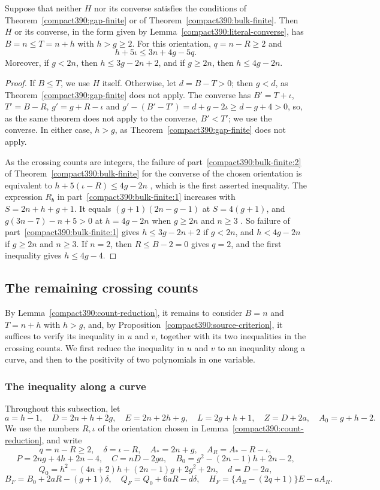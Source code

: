 \begin{lemma}
\label{compact390:count-reduction}
Suppose that neither $H$ nor its converse satisfies the
conditions of Theorem~\ref{compact390:gap-finite} or of Theorem~\ref{compact390:bulk-finite}.
Then $H$ or its converse, in the form given by Lemma~\ref{compact390:literal-converse}, has $B=n\le T=n+h$ with $h>g\ge2$.
For this orientation, $q=n-R\ge2$ and
\[
 h+5\iota\le3n+4g-5q.
\]
Moreover, if $g<2n$, then $h\le3g-2n+2$,
and if $g\ge2n$, then $h\le4g-2n$.
\end{lemma}
\begin{proof}
If $B\le T$, we use $H$ itself. Otherwise, let $d=B-T>0$; then
$g<d$, as Theorem~\ref{compact390:gap-finite} does not apply. The converse has
$B'=T+\iota$, $T'=B-R$, $g'=g+R-\iota$ and
$g'-(B'-T')=d+g-2\iota\ge d-g+4>0$, so, as the same theorem does not apply to the converse,
$B'<T'$; we use the converse. In either case, $h>g$, as Theorem~\ref{compact390:gap-finite} does not apply.

As the crossing counts are integers, the failure of part~\ref{compact390:bulk-finite:2} of
Theorem~\ref{compact390:bulk-finite} for the converse of the chosen orientation is equivalent to
$h+5(\iota-R)\le4g-2n$ , which is the first asserted inequality.
The expression $R_b$ in part~\ref{compact390:bulk-finite:1} increases
with $S=2n+h+g+1$. It equals $(g+1)(2n-g-1)$ at $S=4(g+1)$, and
$g(3n-7)-n+5>0$ at $h=4g-2n$ when $g\ge2n$ and $n\ge3$ .
So failure of part~\ref{compact390:bulk-finite:1} gives $h\le3g-2n+2$
if $g<2n$, and $h<4g-2n$ if $g\ge2n$ and $n\ge3$. If $n=2$, then $R\le B-2=0$ gives
$q=2$, and the first inequality gives $h\le4g-4$.
\end{proof}

\subsection{The remaining crossing counts}\label{sec:remaining}
By Lemma~\ref{compact390:count-reduction}, it remains to consider $B=n$ and $T=n+h$ with $h>g$, and, by Proposition~\ref{compact390:source-criterion}, it suffices to verify its inequality in $u$ and $v$, together with its two inequalities in the crossing counts. We first reduce the inequality in $u$ and $v$ to an inequality along a curve, and then to the positivity of two polynomials in one variable.

\subsubsection{The inequality along a curve}
Throughout this subsection, let
\[
 a=h-1,\quad D=2n+h+2g,\quad E=2n+2h+g,\quad
 L=2g+h+1,\quad Z=D+2a,\quad A_0=g+h-2.
\]
We use the numbers $R,\iota$ of the orientation chosen in Lemma~\ref{compact390:count-reduction}, and write
\[
 q=n-R\ge2,\quad \delta=\iota-R,\quad A_*=2n+g,
 \quad A_R=A_*-R-\iota,
\]
\[
 P=2ng+4h+2n-4,\quad C=nD-2ga,
 \quad B_0=g^2-(2n-1)h+2n-2,
\]
\[
 Q_0=h^2-(4n+2)h+(2n-1)g+2g^2+2n,
 \quad d=D-2a,
\]
\[
 B_F=B_0+2aR-(g+1)\delta,\quad
 Q_F=Q_0+6aR-d\delta,\quad
 H_F=\{A_R-(2q+1)\}E-aA_R.
\]

